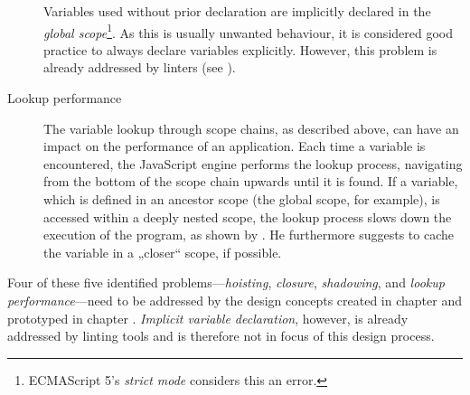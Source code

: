 \begin{description}
Variables used without prior declaration are implicitly declared in the
\emph{global
scope}\footnote{ECMAScript 5’s \emph{strict mode} considers this an error.}.
As this is usually unwanted behaviour, it is considered good practice to
always declare variables explicitly. However, this problem is already
addressed by linters (see ).
\item[Lookup performance]
The variable lookup through scope chains, as described above, can have
an impact on the performance of an application. Each time a variable is
encountered, the JavaScript engine performs the lookup process,
navigating from the bottom of the scope chain upwards until it is found.
If a variable, which is defined in an ancestor scope (the global scope,
for example), is accessed within a deeply nested scope, the lookup
process slows down the execution of the program, as shown by
. He furthermore suggests to cache the variable in
a „closer“ scope, if possible.
\end{description}

Four of these five identified problems—\emph{hoisting}, \emph{closure},
\emph{shadowing}, and \emph{lookup performance}—need to be addressed by
the design concepts created in chapter  and prototyped
in chapter . \emph{Implicit variable declaration},
however, is already addressed by linting tools and is therefore not in
focus of this design process.
